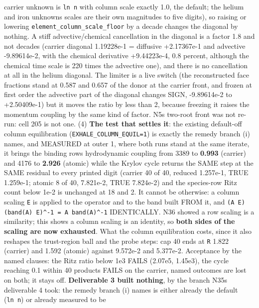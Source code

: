 \documentclass[english,a4paper]{my_memo}
\begin{document}
\begin{itemize}
  carrier unknown is \texttt{ln\ n} with column scale exactly 1.0, the default; the
  helium and iron unknowns\textquotesingle{} scales are their own magnitudes to five digits),
  so raising or lowering \texttt{element\_column\_scale\_floor} by a decade changes the
  diagonal by nothing. A stiff advective/chemical cancellation in the
  diagonal is a factor 1.8 and not decades (carrier diagonal 1.19228e-1 =
  diffusive +2.17367e-1 and advective -9.89614e-2, with the chemical
  derivative +9.44223e-4, 0.8 percent, although the chemical time scale is
  220 times the advective one), and there is no cancellation at all in the
  helium diagonal. The limiter is a live switch (the reconstructed face
  fractions stand at 0.587 and 0.657 of the donor at the carrier front, and
  frozen at first order the advective part of the diagonal changes SIGN,
  -9.89614e-2 to +2.50409e-1) but it moves the ratio by less than 2, because
  freezing it raises the momentum coupling by the same kind of factor. N5\textquotesingle s
  two-root front was not re-run: cell 205 is not one. (4) \textbf{The test that
  settles it}: the existing default-off column equilibration
  (\texttt{EXHALE\_COLUMN\_EQUIL=1}) is exactly the remedy branch (i) names, and
  MEASURED at outer 1, where both runs stand at the same iterate, it brings
  the binding row\textquotesingle s hydrodynamic coupling from 3389 to \textbf{0.993} (carrier)
  and 4176 to \textbf{2.926} (atomic) while the Krylov cycle returns the SAME step
  at the SAME residual to every printed digit (carrier 40 of 40, reduced
  1.257e-1, TRUE 1.259e-1; atomic 8 of 40, 7.821e-2, TRUE 7.824e-2) and the
  species-row Ritz count below 1e-2 is unchanged at 18 and 2. It cannot be
  otherwise: a column scaling \texttt{E} is applied to the operator and to the band
  built FROM it, and \texttt{(A\ E)(band(A)\ E)\^{}-1\ =\ A\ band(A)\^{}-1} IDENTICALLY. N36
  showed a row scaling is a similarity; this shows a column scaling is an
  identity, so \textbf{both sides of the scaling are now exhausted}. What the column equilibration
  costs, since it also reshapes the trust-region ball and the probe steps:
  cap 40 ends at \texttt{\textbar{}\textbar{}R\textbar{}\textbar{}} 1.822 (carrier) and 1.592 (atomic) against 9.572e-2
  and 5.377e-2. Acceptance by the named clauses: the Ritz ratio below 1e3
  FAILS (2.07e5, 1.45e3), the cycle reaching 0.1 within 40 products FAILS on
  the carrier, named outcomes are lost on both; it stays off. \textbf{Deliverable 3
  built nothing}, by the branch N35\textquotesingle s deliverable 4 took: the remedy branch
  (i) names is either already the default (\texttt{ln\ n}) or already measured to be

\end{itemize}
\end{document}
